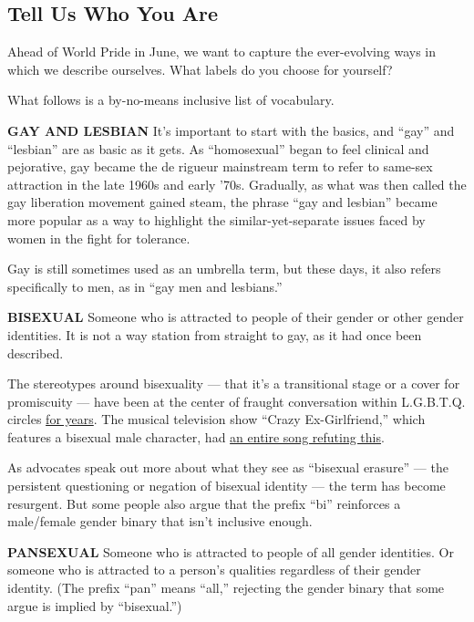 \hypertarget{tell-us-who-you-are}{%
\subsection{Tell Us Who You Are}\label{tell-us-who-you-are}}

Ahead of World Pride in June, we want to capture the ever-evolving ways
in which we describe ourselves. What labels do you choose for yourself?

What follows is a by-no-means inclusive list of vocabulary.

\textbf{GAY AND LESBIAN} It's important to start with the basics, and
``gay'' and ``lesbian'' are as basic as it gets. As ``homosexual'' began
to feel clinical and pejorative, gay became the de rigueur mainstream
term to refer to same-sex attraction in the late 1960s and early '70s.
Gradually, as what was then called the gay liberation movement gained
steam, the phrase ``gay and lesbian'' became more popular as a way to
highlight the similar-yet-separate issues faced by women in the fight
for tolerance.

Gay is still sometimes used as an umbrella term, but these days, it also
refers specifically to men, as in ``gay men and lesbians.''

\textbf{BISEXUAL} Someone who is attracted to people of their gender or
other gender identities. It is not a way station from straight to gay,
as it had once been described.

The stereotypes around bisexuality --- that it's a transitional stage or
a cover for promiscuity --- have been at the center of fraught
conversation within L.G.B.T.Q. circles
\href{https://www.nytimes3xbfgragh.onion/2005/07/05/health/straight-gay-or-lying-bisexuality-revisited.html}{for
years}. The musical television show ``Crazy Ex-Girlfriend,'' which
features a bisexual male character, had
\href{https://www.youtube.com/watch?v=5e7844P77Is}{an entire song
refuting this}.

As advocates speak out more about what they see as ``bisexual erasure''
--- the persistent questioning or negation of bisexual identity --- the
term has become resurgent. But some people also argue that the prefix
``bi'' reinforces a male/female gender binary that isn't inclusive
enough.

\textbf{PANSEXUAL} Someone who is attracted to people of all gender
identities. Or someone who is attracted to a person's qualities
regardless of their gender identity. (The prefix ``pan'' means ``all,''
rejecting the gender binary that some argue is implied by ``bisexual.'')


